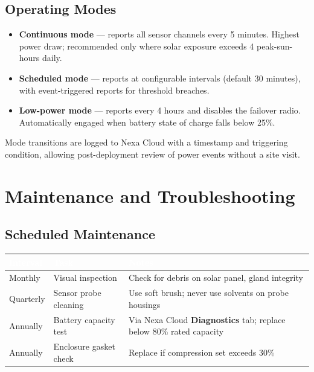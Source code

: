 \documentclass[11pt,a4paper,oneside,headings=big,chapterprefix=true]{scrreprt}
\begin{document}
\section{Operating Modes}

\begin{itemize}
  \item \textbf{Continuous mode} --- reports all sensor channels every 5 minutes. Highest power draw; recommended only where solar exposure exceeds 4 peak-sun-hours daily.
  \item \textbf{Scheduled mode} --- reports at configurable intervals (default 30 minutes), with event-triggered reports for threshold breaches.
  \item \textbf{Low-power mode} --- reports every 4 hours and disables the failover radio. Automatically engaged when battery state of charge falls below 25\%.
\end{itemize}

\begin{notebox}
Mode transitions are logged to Nexa Cloud with a timestamp and triggering condition, allowing post-deployment review of power events without a site visit.
\end{notebox}

\chapter{Maintenance and Troubleshooting}
\label{ch:maintenance}

\section{Scheduled Maintenance}

\begin{center}
\renewcommand{\arraystretch}{1.3}
\begin{tabularx}{\textwidth}{@{}l l X@{}}
\toprule
\rowcolor{steel}
\textcolor{white}{\bfseries Interval} & \textcolor{white}{\bfseries Task} & \textcolor{white}{\bfseries Notes} \\
\midrule
Monthly & Visual inspection & Check for debris on solar panel, gland integrity \\
\rowcolor{fogbg}
Quarterly & Sensor probe cleaning & Use soft brush; never use solvents on probe housings \\
Annually & Battery capacity test & Via Nexa Cloud \textbf{Diagnostics} tab; replace below 80\% rated capacity \\
\rowcolor{fogbg}
Annually & Enclosure gasket check & Replace if compression set exceeds 30\% \\
\bottomrule
\end{tabularx}
\end{center}
\end{document}
